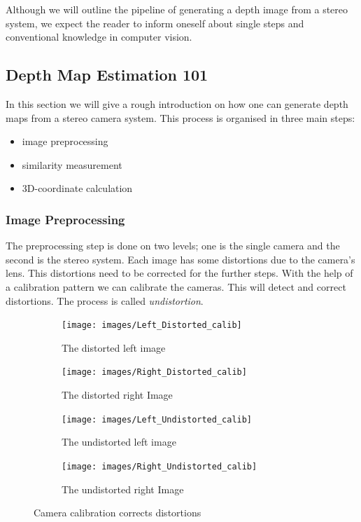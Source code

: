 \documentclass[11pt]{article}
\begin{document}
Although we will outline the pipeline of generating a depth image from a stereo system, we expect the reader to inform oneself about single steps and conventional knowledge in computer vision.

\subsection{Depth Map Estimation 101}\label{sec:101}
In this section we will give a rough introduction on how one can generate depth maps from a stereo camera system. This process is organised in three main steps:
\begin{itemize}
	\item image preprocessing
	\item similarity measurement
	\item 3D-coordinate calculation
\end{itemize}
\subsubsection{Image Preprocessing} %
The preprocessing step is done on two levels; one is the single camera and the second is the stereo system. Each image has some distortions due to the camera's lens. This distortions need to be corrected for the further steps. With the help of a calibration pattern we can calibrate the cameras. This will detect and correct distortions. The process is called \emph{undistortion}. 

\begin{figure}[H]
        \centering
        \begin{subfigure}[b]{0.45\textwidth}
                \texttt{[image: images/Left\_Distorted\_calib]}
                \caption{The distorted left image}
                \label{fig:ex1_left}
        \end{subfigure}\hfill  
        \begin{subfigure}[b]{0.45\textwidth}
                \texttt{[image: images/Right\_Distorted\_calib]}
                \caption{The distorted right Image}
                \label{fig:ex1_right}
        \end{subfigure}

       \begin{subfigure}[b]{0.45\textwidth}
                \texttt{[image: images/Left\_Undistorted\_calib]}
                \caption{The undistorted left image}
                \label{fig:ex1_left}
        \end{subfigure}\hfill  
        \begin{subfigure}[b]{0.45\textwidth}
                \texttt{[image: images/Right\_Undistorted\_calib]}
                \caption{The undistorted right Image}
                \label{fig:ex1_right}
        \end{subfigure}
        \caption{Camera calibration corrects distortions}\label{fig:undistortion}
\end{figure}
\end{document}
